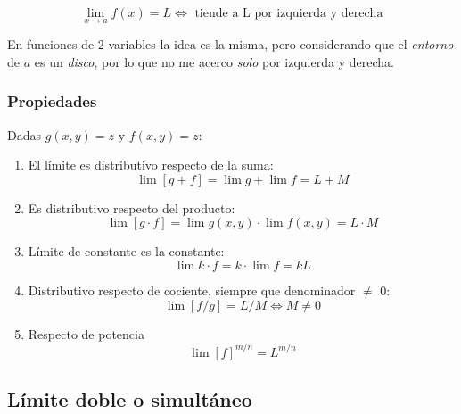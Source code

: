 \begin{equation*}
    \lim_{x\to a} f(x) = L \iff \text{ tiende a L por izquierda y derecha}
\end{equation*}

En funciones de 2 variables la idea es la misma, pero considerando que el
\textit{entorno} de \(a\) es un \textit{disco}, por lo que no me acerco
\textit{solo} por izquierda y derecha.

\subsubsection{Propiedades}

Dadas \(g(x,y) = z\) y \(f(x,y) = z\):

\begin{enumerate}
    \item El límite es distributivo respecto de la suma:
          \begin{equation*}
              \lim \left[g + f\right] = \lim g + \lim f = L + M
          \end{equation*}

    \item Es distributivo respecto del producto:
          \begin{equation*}
              \lim \left[g \cdot f\right] = \lim g(x,y) \cdot \lim f(x,y) = L\cdot M
          \end{equation*}

    \item Límite de constante es la constante:
          \begin{equation*}
              \lim k\cdot f = k\cdot\lim f = kL
          \end{equation*}

    \item Distributivo respecto de cociente, siempre que denominador \(\neq\) 0:
          \begin{equation*}
              \lim \left[f/g\right] = L/M \iff M \neq 0
          \end{equation*}

    \item Respecto de potencia
          \begin{equation*}
              \lim [f]^{m/n} = L^{m/n}
          \end{equation*}
\end{enumerate}


\subsection{Límite doble o simultáneo}

